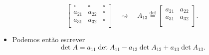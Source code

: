 \documentclass[../livro.tex]{subfiles}  %
\begin{document}
\begin{itemize}
\[
\begin{bmatrix}
\square & \square & \square \\
a_{21}  & a_{22}  & \square \\
a_{31}  & a_{32}  & \square \\
\end{bmatrix} \quad \rightsquigarrow \quad A_{13} \stackrel{\text{def}}{=} 
\begin{bmatrix}
a_{21}  & a_{22} \\
a_{31}  & a_{32} \\
\end{bmatrix}.
\] 
\item Podemos então escrever
\begin{equation}\label{detminor}
\boxed{\det A = a_{11} \det A_{11} - a_{12} \det A_{12} +  a_{13} \det A_{13}.}
\end{equation}
\end{itemize}
\end{document}
